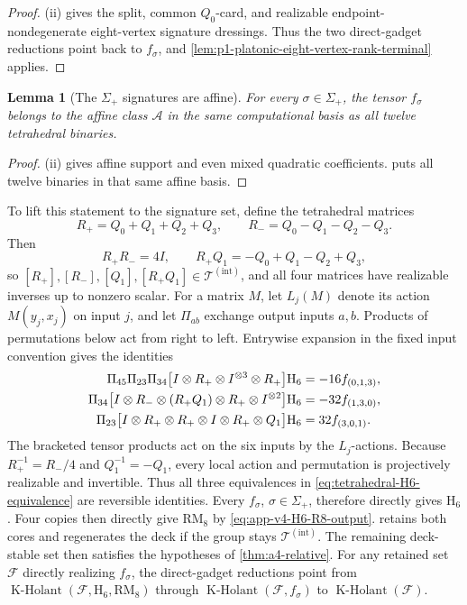 \documentclass[11pt,letterpaper,onecolumn]{article}
\theoremstyle{plain}
\newtheorem{lemma}[lemma]{Lemma}
\theoremstyle{definition}
\theoremstyle{remark}
\newcommand{\cF}{\mathcal F}
\newcommand{\cA}{\mathscr A}
\newcommand{\KHolant}{\operatorname{K\text{-}Holant}}
\newcommand{\TetInt}{{\mathcal T^{(\mathrm{int})}}}
\newcommand{\RMcore}{\mathrm{RM}_8}
\newcommand{\Hcore}{\mathrm{H}_6}
\begin{document}
\begin{proof}
\textnormal{(ii)} gives the split,
common \(Q_0\)-card, and realizable
endpoint-nondegenerate eight-vertex signature dressings.  Thus the two
direct-gadget reductions point back to \(f_\sigma\), and
\cref{lem:p1-platonic-eight-vertex-rank-terminal} applies.
\end{proof}

\begin{lemma}[The \(\Sigma_+\) signatures are affine]
\label{lem:tetrahedral-affine}
For every \(\sigma\in\Sigma_+\), the tensor \(f_\sigma\) belongs to the
affine class \(\cA\) in the same computational basis as all twelve
tetrahedral binaries.
\end{lemma}

\begin{proof}
\textnormal{(ii)} gives affine
support and even mixed quadratic coefficients.  puts all twelve
binaries in that same affine basis.
\end{proof}

To lift this statement to the signature set, define the tetrahedral matrices
\[
  R_+=Q_0+Q_1+Q_2+Q_3,\qquad
  R_-=Q_0-Q_1-Q_2-Q_3.
\]
Then
\begin{equation*}
 R_+R_-=4I,\qquad
 R_+Q_1=-Q_0+Q_1-Q_2+Q_3,
\end{equation*}
so \([R_+],[R_-],[Q_1],[R_+Q_1]\in\TetInt\), and all four matrices
have realizable inverses up to nonzero scalar.  For a matrix \(M\), let
\(L_j(M)\) denote its action \(M(y_j,x_j)\) on input \(j\), and
let \(\Pi_{ab}\) exchange output inputs \(a,b\). Products of permutations
below act from right to left.  Entrywise expansion in the fixed input convention gives the identities
\begin{align}
 \Pi_{45}\Pi_{23}\Pi_{34}
 \bigl[I\otimes R_+\otimes I^{\otimes3}\otimes R_+\bigr]\Hcore
   &=-16 f_{(0,1,3)},\notag\\
 \Pi_{34}
 \bigl[I\otimes R_-\otimes(R_+Q_1)\otimes R_+
              \otimes I^{\otimes2}\bigr]\Hcore
   &=-32 f_{(1,3,0)},\notag\\
 \Pi_{23}
 \bigl[I\otimes R_+\otimes R_+\otimes I\otimes R_+\otimes Q_1\bigr]\Hcore
   &=32 f_{(3,0,1)}.
  \label{eq:tetrahedral-H6-equivalence}
\end{align}
The bracketed tensor products act on the six inputs by the \(L_j\)-actions.  Because \(R_+^{-1}=R_-/4\) and
\(Q_1^{-1}=-Q_1\), every local action and permutation is projectively
realizable and invertible.  Thus all three equivalences in
\cref{eq:tetrahedral-H6-equivalence} are reversible identities.
Every \(f_\sigma\), \(\sigma\in\Sigma_+\), therefore directly gives \(\Hcore\). Four copies then directly give \(\RMcore\) by
\cref{eq:app-v4-H6-R8-output}. 
retains both cores and regenerates the deck if the group stays \(\TetInt\).
The remaining deck-stable set then satisfies the hypotheses of
\cref{thm:a4-relative}. For any retained set \(\cF\) directly realizing
\(f_\sigma\), the direct-gadget reductions point from
\(\KHolant(\cF,\Hcore,\RMcore)\) through
\(\KHolant(\cF,f_\sigma)\) to \(\KHolant(\cF)\).
\end{document}
